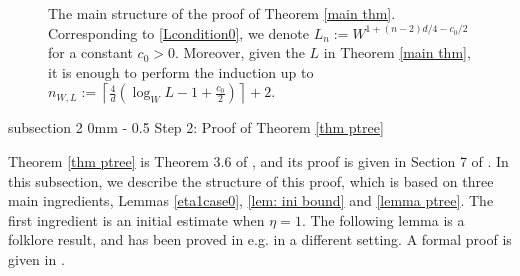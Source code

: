\documentclass{article}
\makeatletter
\newcommand{\1}{\mathds{1}}
\numberwithin{equation}{section}
\newcommand{\be}{\begin{equation}}
\newcommand{\ee}{\end{equation}}
\renewcommand{\leq}{\leqslant}
\renewcommand{\le}{\leq}
\newcommand{\Z}{\mathbb{Z}}
\theoremstyle{plain} %
\theoremstyle{remark}
\newcommand{\cob}{\color{purple}}
\renewcommand{\subsection}{\@startsection
{subsection}%
{2}%
{0mm}%
{-\baselineskip}%
{0.5\baselineskip}%
{\normalfont\bf\itshape}} %
\makeatother
\begin{document}
\begin{figure}[htb]
\begin{center}
\end{center}
\caption{The main structure of the proof of Theorem \ref{main thm}. Corresponding to \eqref{Lcondition0}, we denote $L_n:=W^{1+(n-2)d/{4} - {c_0}/{2}}$ for a  constant $c_0>0$. Moreover, given the $L$ in Theorem \ref{main thm}, it is enough to perform the induction up to $n_{W,L}:= \left\lceil\frac{4}{d}\left(\log_W L  - 1 + \frac{c_0}{2}\right)\right\rceil+2$.}\label{Fig pfchart1}
\end{figure}

\subsection{Step 2: Proof of Theorem \ref{thm ptree}}\label{sec_strat_step1}
%

Theorem \ref{thm ptree} is Theorem 3.6 of \cite{PartII_high}, and its proof is given in Section 7 of \cite{PartII_high}. In this subsection, we describe the structure of this proof, which is based on three main ingredients, Lemmas \ref{eta1case0}, \ref{lem: ini bound} and \ref{lemma ptree}. The first ingredient is an initial estimate when $\eta=1$. The following lemma is a folklore result, and has been proved in e.g. \cite{delocal} in a different setting. A formal proof is given in \cite{PartII_high}.
\end{document}
